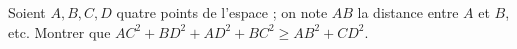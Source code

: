 Soient $A, B, C, D$ quatre points de l'espace ; on note $AB$ la distance entre $A$ et $B$, etc. Montrer que $AC^2 + BD^2 + AD^2 + BC^2 \geq AB^2 + CD^2$.
